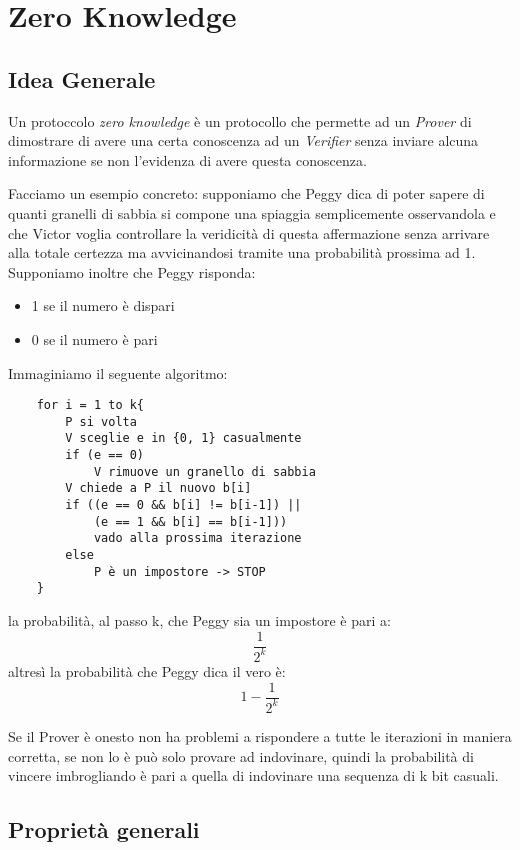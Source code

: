 \section{Zero Knowledge}

\subsection{Idea Generale}
Un protoccolo \emph{zero knowledge} è un protocollo che permette ad un \emph{Prover} di dimostrare di avere una certa conoscenza ad un \emph{Verifier} senza inviare alcuna informazione se non l'evidenza di avere questa conoscenza.

Facciamo un esempio concreto: supponiamo che Peggy dica di poter sapere di quanti granelli di sabbia si compone una spiaggia semplicemente osservandola e che Victor voglia controllare la veridicità di questa affermazione senza arrivare alla totale certezza ma avvicinandosi tramite una probabilità prossima ad 1. Supponiamo inoltre che Peggy risponda:

\begin{itemize}
    \item 1 se il numero è dispari
    \item 0 se il numero è pari
\end{itemize}

Immaginiamo il seguente algoritmo:

\begin{verbatim}
    for i = 1 to k{
        P si volta
        V sceglie e in {0, 1} casualmente
        if (e == 0)
            V rimuove un granello di sabbia
        V chiede a P il nuovo b[i]
        if ((e == 0 && b[i] != b[i-1]) || 
            (e == 1 && b[i] == b[i-1]))
            vado alla prossima iterazione
        else
            P è un impostore -> STOP
    }
\end{verbatim}

la probabilità, al passo k, che Peggy sia un impostore è pari a:
$$
    \frac{1}{2^k}
$$
altresì la probabilità che Peggy dica il vero è:
$$
    1 - \frac{1}{2^k}
$$

Se il Prover è onesto non ha problemi a rispondere a tutte le iterazioni in maniera corretta, se non lo è può solo provare ad indovinare, quindi la probabilità di vincere imbrogliando è pari a quella di indovinare una sequenza di k bit casuali. 


\subsection{Proprietà generali}

